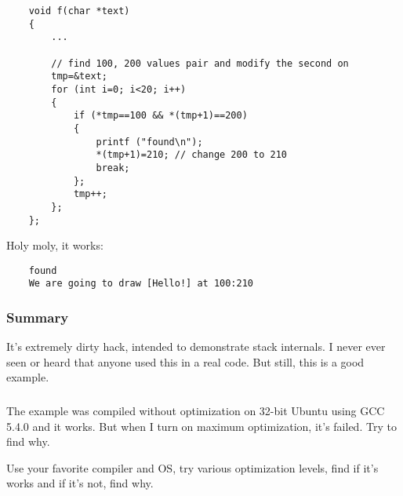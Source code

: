 \begin{lstlisting}
	void f(char *text)
	{
		...

		// find 100, 200 values pair and modify the second on
		tmp=&text;
		for (int i=0; i<20; i++)
		{
			if (*tmp==100 && *(tmp+1)==200)
			{
				printf ("found\n");
				*(tmp+1)=210; // change 200 to 210
				break;
			};
			tmp++;
		};
	};
\end{lstlisting}

Holy moly, it works:

\begin{lstlisting}
	found
	We are going to draw [Hello!] at 100:210
\end{lstlisting}

\subsubsection{Summary}

It's extremely dirty hack, intended to demonstrate stack internals.
I never ever seen or heard that anyone used this in a real code.
But still, this is a good example.

\subsubsection{\Exercise}

The example was compiled without optimization on 32-bit Ubuntu using GCC 5.4.0 and it works.
But when I turn on  maximum optimization, it's failed.
Try to find why.

Use your favorite compiler and OS, try various optimization levels, find if it's works and if it's not, find why.


